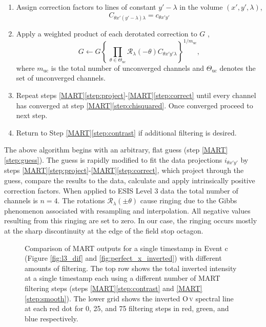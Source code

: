 \begin{enumerate}
	\item Assign correction factors to lines of constant $y'-\lambda$ in the volume $(x',y',\lambda)$,
	\begin{equation}
	C_{\theta x'(y'-\lambda)\lambda} = c_{\theta x'y'}
	\end{equation}	
	\item \label{step:correct} Apply a weighted product of each derotated correction to $G$ ,
	\begin{equation}\label{eq:correct}
	G \leftarrow G\left\lbrace  \,\prod_{\theta\in\Theta_{\mathrm{uc}}}  \mathcal{R}_\lambda(-\theta)C_{\theta x'y'\lambda} \right\rbrace^{1/m_{\mathrm{uc}}},
	\end{equation}
	where $m_{\mathrm{uc}}$ is the total number of unconverged channels and $\Theta_{\mathrm{uc}}$ denotes the set of unconverged channels.
	
	\item Repeat steps \ref{MART}\ref{step:project}-\ref{MART}\ref{step:correct}
	until every channel has converged at step \ref{MART}\ref{step:chisquared}. Once converged proceed to next step.
	\item Return to Step \ref{MART}\ref{step:contrast} if additional filtering is desired.
\end{enumerate}
The above algorithm begins with an arbitrary, flat guess (step \ref{MART}\ref{step:guess}). The guess is rapidly modified to fit the data projections $i_{\theta x' y'}$ by steps \ref{MART}\ref{step:project}-\ref{MART}\ref{step:correct}, which project through the guess, compare the results to the data, calculate and apply intrinsically positive correction factors. 
When applied to  ESIS Level 3 data the total number of channels is $n = 4$. 
The rotations $\mathcal{R}_{\lambda}(\pm{\theta})$ cause ringing due to the Gibbs phenomenon associated with resampling and interpolation. 
All negative values resulting from this ringing are set to zero.
In our case, the ringing occurs mostly at the sharp discontinuity at the edge of the field stop octagon. 

\begin{figure}[htb!]
	\center
	\caption{Comparison of MART outputs for a single timestamp in Event c (Figure \ref{fig:l3_dif} and \ref{fig:perfect_x_inverted}) with different amounts of filtering. 
		The top row shows the total inverted intensity at a single timestamp each using a different number of MART filtering steps (steps \ref{MART}\ref{step:contrast} and \ref{MART}\ref{step:smooth}).  
		The lower grid shows the inverted O\,\textsc{v} spectral line at each red dot for 0, 25, and 75 filtering steps in red, green, and blue respectively.}
	\label{fig:perfect_x_invertcomp}
\end{figure}


